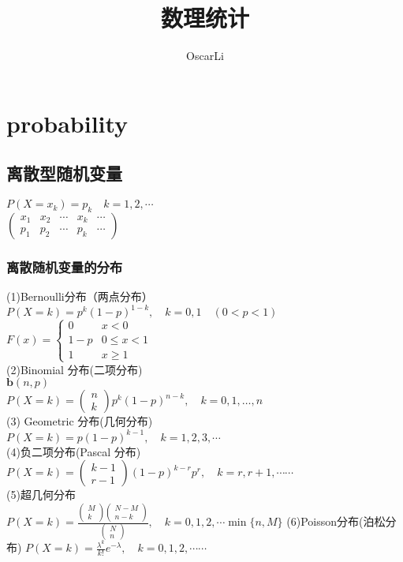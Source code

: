 \documentclass{report}
\begin{document}
\title{数理统计} 
\author{OscarLi}
\maketitle 
\tableofcontents
\chapter{probability}
\section{离散型随机变量}
$P\left(X=x_{k}\right)=p_{k} \quad k=1,2, \cdots$\\
$\left(\begin{array}{lllll}{x_{1}} & {x_{2}} & {\cdots} & {x_{k}} & {\cdots} \\ {p_{1}} & {p_{2}} & {\cdots} & {p_{k}} & {\cdots}\end{array}\right)$
\subsection{离散随机变量的分布}
(1)Bernoulli分布（两点分布）\\
$P(X=k)=p^{k}(1-p)^{1-k}, \quad k=0,1 \quad(0<p<1)$\\
$F(x)=\left\{\begin{array}{cc}{0} & {x<0} \\ {1-p} & {0 \leq x<1} \\ {1} & {x \geq 1}\end{array}\right.$\\
(2)Binomial 分布(二项分布)\\
$\boldsymbol{b}(n, p)$\\
$P(X=k)=\left(\begin{array}{l}{n} \\ {k}\end{array}\right) p^{k}(1-p)^{n-k}, \quad k=0,1, \ldots, n$\\
(3) Geometric 分布(几何分布)\\
$P(X=k)=p(1-p)^{k-1}, \quad k=1,2,3, \cdots$\\
(4)负二项分布(Pascal 分布)\\
$P(X=k)=\left(\begin{array}{c}{k-1} \\ {r-1}\end{array}\right)(1-p)^{k-r} p^{r}, \quad k=r, r+1, \cdots \cdots$\\
(5)超几何分布\\
$P(X=k)=\frac{\left(\begin{array}{c}{M} \\ {k}\end{array}\right)\left(\begin{array}{c}{N-M} \\ {n-k}\end{array}\right)}{\left(\begin{array}{c}{N} \\ {n}\end{array}\right)}, \quad k=0,1,2, \cdots \min \{n, M\}$
(6)Poisson分布(泊松分布)
$P(X=k)=\frac{\lambda^{k}}{k !} e^{-\lambda}, \quad k=0,1,2, \cdots \cdots$
\end{document}
